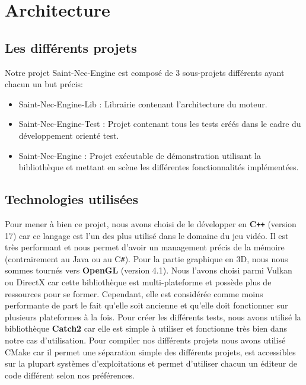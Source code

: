 \section{Architecture}


\subsection{Les différents projets}

Notre projet Saint-Nec-Engine est composé de 3 sous-projets différents ayant chacun un but précis:
\begin{itemize}
	
	\item Saint-Nec-Engine-Lib : Librairie contenant l'architecture du moteur.
	\item Saint-Nec-Engine-Test : Projet contenant tous les tests créés dans le cadre du développement orienté test.
	\item Saint-Nec-Engine : Projet exécutable de démonstration utilisant la bibliothèque et mettant en scène les différentes fonctionnalités implémentées.
\end{itemize} 

\subsection{Technologies utilisées}

Pour mener à bien ce projet, nous avons choisi de le développer en \textbf{C\verb!++!} (version 17) car ce langage est l'un des plus utilisé dans le domaine du jeu vidéo. Il est très performant et nous permet d'avoir un management précis de la mémoire (contrairement au Java ou au C\verb|#|). Pour la partie graphique en 3D, nous nous sommes tournés vers \textbf{OpenGL} (version 4.1). Nous l'avons choisi parmi Vulkan ou DirectX car cette bibliothèque est multi-plateforme et possède plus de ressources pour se former. Cependant, elle est considérée comme moins performante de part le fait qu'elle soit ancienne et qu'elle doit fonctionner sur plusieurs plateformes à la fois. Pour créer les différents tests, nous avons utilisé la bibliothèque \textbf{Catch2} car elle est simple à utiliser et fonctionne très bien dans notre cas d'utilisation. Pour compiler nos différents projets nous avons utilisé CMake car il permet une séparation simple des différents projets, est accessibles sur la plupart systèmes d'exploitations et permet d'utiliser chacun un éditeur de code différent selon nos préférences.


